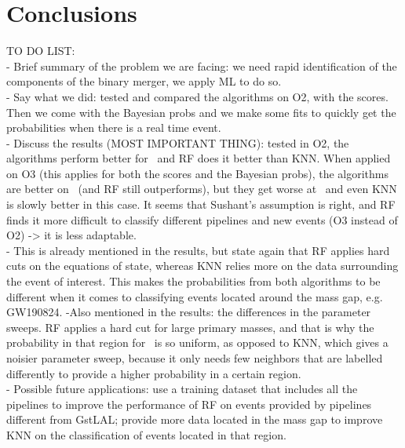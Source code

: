 \section{Conclusions\label{conclusions}}

TO DO LIST:
\\
- Brief summary of the problem we are facing: we need rapid identification of the components of the binary merger, we apply ML to do so. \\
- Say what we did: tested and compared the algorithms on O2, with the scores. Then we come with the Bayesian probs and we make some fits to quickly get the probabilities when there is a real time event. \\
- Discuss the results (MOST IMPORTANT THING): tested in O2, the algorithms perform better for \hasrem\, and RF does it better than KNN. When applied on O3 (this applies for both the scores and the Bayesian probs), the algorithms are better on \hasns\ (and RF still outperforms), but they get worse at \hasrem\, and even KNN is slowly better in this case. It seems that Sushant's assumption is right, and RF finds it more difficult to classify different pipelines and new events (O3 instead of O2) -> it is less adaptable. \\
- This is already mentioned in the results, but state again that RF applies hard cuts on the equations of state, whereas KNN relies more on the data surrounding the event of interest. This makes the probabilities from both algorithms to be different when it comes to classifying events located around the mass gap, e.g. GW190824. 
-Also mentioned in the results: the differences in the parameter sweeps. RF applies a hard cut for large primary masses, and that is why the probability in that region for \hasns\ is so uniform, as opposed to KNN, which gives a noisier parameter sweep, because it only needs few neighbors that are labelled differently to provide a higher probability in a certain region.  \\
- Possible future applications: use a training dataset that includes all the pipelines to improve the performance of RF on events provided by pipelines different from GstLAL; provide more data located in the mass gap to improve KNN on the classification of events located in that region. 
